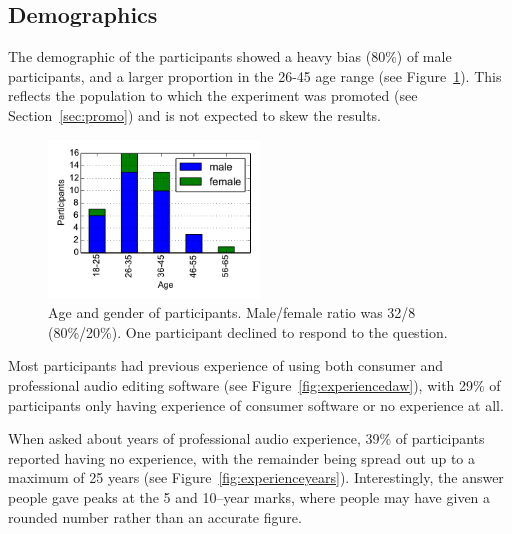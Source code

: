 \subsection{Demographics}
The demographic of the participants showed a heavy bias (80\%) of male participants, and a larger proportion in the
26-45 age range (see Figure~\ref{fig:age}). This reflects the population to which the experiment was promoted (see
Section~\ref{sec:promo}) and is not expected to skew the results.

\begin{figure}[ht]
  \centering
  \includegraphics[width=0.5\textwidth]{figs/age.pdf}
  \caption{Age and gender of participants. Male/female ratio was 32/8
    (80\%/20\%). One participant declined to respond to the question.}
  \label{fig:age}
\end{figure}

Most participants had previous experience of using both consumer and professional audio editing software (see
Figure~\ref{fig:experiencedaw}), with 29\% of participants only having experience of consumer software or no experience
at all.

When asked about years of professional audio experience, 39\% of participants reported having no experience, with the
remainder being spread out up to a maximum of 25 years (see Figure~\ref{fig:experienceyears}). Interestingly, the
answer people gave peaks at the 5 and 10--year marks, where people may have given a rounded number rather than an
accurate figure.


